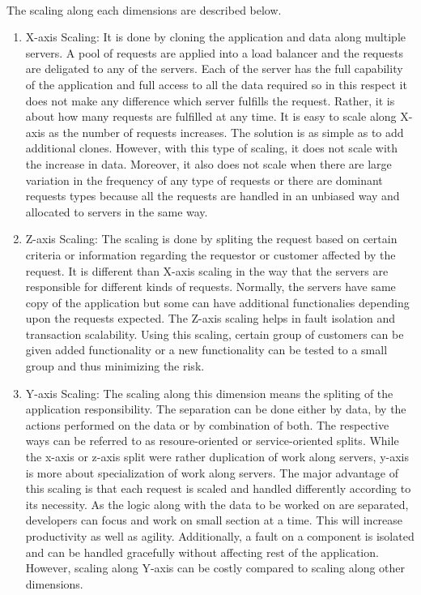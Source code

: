 \\
The scaling along each dimensions are described below. \cite{Fisher:2015aa}\cite{MacVittie:2014aa}\cite{Richardson:2014aa}
\begin{enumerate}
\item X-axis Scaling: It is done by cloning the application and data along multiple servers. A pool of requests are applied into a load balancer and the requests are deligated to any of the servers. Each of the server has the full capability of the application and full access to all the data required so in this respect it does not make any difference which server fulfills the request. Rather, it is about how many requests are fulfilled at any time. It is easy to scale along X-axis as the number of requests increases. The solution is as simple as to add additional clones. However, with this type of scaling, it does not scale with the increase in data. Moreover, it also does not scale when there are large variation in the frequency of any type of requests or there are dominant requests types because all the requests are handled in an unbiased way and allocated to servers in the same way.
\\
\item Z-axis Scaling: The scaling is done by spliting the request based on certain criteria or information regarding the requestor or customer affected by the request. It is different than X-axis scaling in the way that the servers are responsible for different kinds of requests. Normally, the servers have same copy of the application but some can have additional functionalies depending upon the requests expected. The Z-axis scaling helps in fault isolation and transaction scalability. Using this scaling, certain group of customers can be given added functionality or a new functionality can be tested to a small group and thus minimizing the risk.
\\
\item Y-axis Scaling: The scaling along this dimension means the spliting of the application responsibility. The separation can be done either by data, by the actions performed on the data or by combination of both. The respective ways can be referred to as resoure-oriented or service-oriented splits. While the x-axis or z-axis split were rather duplication of work along servers, y-axis is more about specialization of work along servers. The major advantage of this scaling is that each request is scaled and handled differently according to its necessity. As the logic along with the data to be worked on are separated, developers can focus and work on small section at a time. This will increase productivity as well as agility. Additionally, a fault on a component is isolated and can be handled gracefully without affecting rest of the application. However, scaling along Y-axis can be costly compared to scaling along other dimensions.
\end{enumerate}
